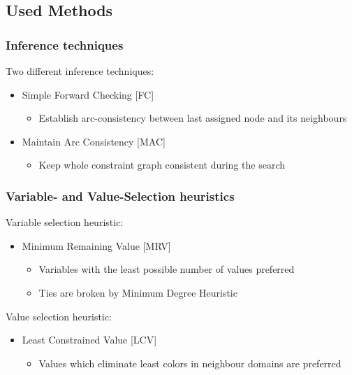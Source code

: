 \documentclass{beamer}
\begin{document}
\subsection{Used Methods}
\begin{frame}
    \frametitle{Inference techniques}
	Two different inference techniques:
	\begin{itemize}
	\item{Simple Forward Checking [FC]}	
		\begin{itemize}	
		\item{Establish arc-consistency between last assigned node and its neighbours}
		\end{itemize}
	\item{Maintain Arc Consistency [MAC]}
	\begin{itemize}	
		\item{Keep whole constraint graph consistent during the search}
		\end{itemize}
	\end{itemize}

  \end{frame}

\begin{frame}
    \frametitle{Variable- and Value-Selection heuristics}
	Variable selection heuristic:
	\begin{itemize}
	\item{Minimum Remaining Value [MRV]}
          \begin{itemize}
          \item{Variables with the least possible number of values preferred}
          \item{Ties are broken by Minimum Degree Heuristic}
          \end{itemize}
	\end{itemize}
	Value selection heuristic:
	\begin{itemize}
	\item{Least Constrained Value [LCV]}
          \begin{itemize}
          \item{Values which eliminate least colors in neighbour domains are preferred}
          \end{itemize}
          
	\end{itemize}
  \end{frame}
\end{document}
